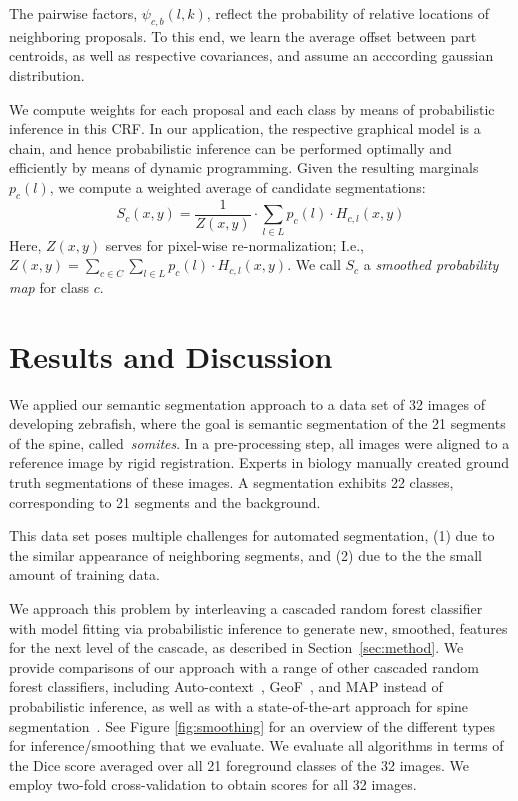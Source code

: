 \documentclass[10pt,twocolumn,letterpaper]{article}
\begin{document}
The pairwise factors, $\psi_{c,b}(l,k)$, reflect the probability of relative locations of neighboring proposals. To this end, we learn the average offset between part centroids, as well as respective covariances, and assume an acccording gaussian distribution. 

We compute weights for each proposal and each class by means of probabilistic inference in this CRF. In our application, the respective graphical model is a chain, and hence probabilistic inference can be performed optimally and efficiently by means of dynamic programming. 
%
Given the resulting marginals $p_c(l)$, we compute a weighted average of candidate segmentations: 
\begin{equation}
 S_c(x,y) = \frac{1}{Z(x,y)} \cdot \sum_{l\in L} p_c(l)\cdot H_{c,l}(x,y) 
\label{eq:weighting}
\end{equation}
%
Here, $Z(x,y)$ serves for pixel-wise re-normalization; I.e., $Z(x,y)=\sum_{c\in C}\sum_{l\in L} p_c(l)\cdot H_{c,l}(x,y)$.
%
We call $S_c$ a \emph{smoothed probability map} for class $c$. 

\section{Results and Discussion}

We applied our semantic segmentation approach to a data set of 32 images of developing zebrafish, where the goal is semantic segmentation of the 21 segments of the spine, called~\emph{somites}. In a pre-processing step, all images were aligned to a reference image by rigid registration. Experts in biology manually created ground truth segmentations of these images. A segmentation exhibits 22 classes, corresponding to 21 segments and the background. 

This data set poses multiple challenges for automated segmentation, (1) due to the similar appearance of neighboring segments, and (2) due to the the small amount of training data.

We approach this problem by interleaving a cascaded random forest classifier with model fitting via probabilistic inference to generate new, smoothed, features for the next level of the cascade, as described in Section~\ref{sec:method}. 
%
We provide comparisons of our approach with a range of other cascaded random forest classifiers, including Auto-context~\cite{AutoContext2008}, GeoF~\cite{GeoForests2013}, and MAP instead of probabilistic inference, as well as with a state-of-the-art approach for spine segmentation~\cite{Glocker2013}.  See Figure \ref{fig:smoothing} for an overview of the different types for inference/smoothing that we evaluate.  We evaluate all algorithms in terms of the Dice score averaged over all 21 foreground classes of the 32 images. We employ two-fold cross-validation to obtain scores for all 32 images.
\end{document}

